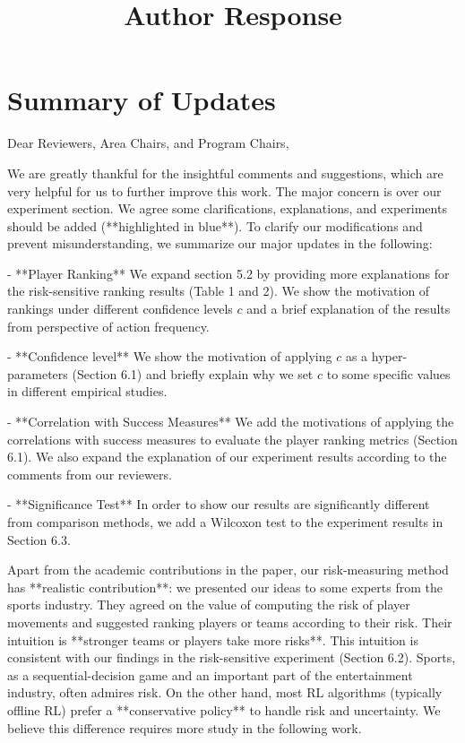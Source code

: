 \documentclass{article}
\title{Author Response}
\author{}
\begin{document}
\maketitle

\section{Summary of Updates}

Dear Reviewers, Area Chairs, and Program Chairs, 

We are greatly thankful for the insightful comments and suggestions, which are very helpful for us to further improve this work.
The major concern is over our experiment section. We agree some clarifications, explanations, and experiments should be added (**highlighted in blue**). To clarify our modifications and prevent misunderstanding, we summarize our major updates in the following:

- **Player Ranking** We expand section 5.2 by providing more explanations for the risk-sensitive ranking results (Table 1 and 2). We show the motivation of rankings under different confidence levels $c$ and a brief explanation of the results from perspective of action frequency.

- **Confidence level** We show the motivation of applying $c$ as a hyper-parameters (Section 6.1) and briefly explain why we set $c$ to some specific values in different empirical studies.

- **Correlation with Success Measures** We add the motivations of applying the correlations with success measures to evaluate the player ranking metrics (Section 6.1). We also expand the explanation of our experiment results according to the comments from our reviewers.

- **Significance Test** In order to show our results are significantly different from comparison methods, we add a Wilcoxon test to the experiment results in Section 6.3.


Apart from the academic contributions in the paper, our risk-measuring method has **realistic contribution**: we presented our ideas to some experts from the sports industry. They agreed on the value of computing the risk of player movements and suggested ranking players or teams according to their risk. Their intuition is **stronger teams or players take more risks**. This intuition is consistent with our findings in the risk-sensitive experiment (Section 6.2). 
Sports, as a sequential-decision game and an important part of the entertainment industry, often admires risk.
On the other hand,  most RL algorithms (typically offline RL) prefer a **conservative policy** to handle risk and uncertainty. We believe this difference requires more study in the following work. 
\end{document}
